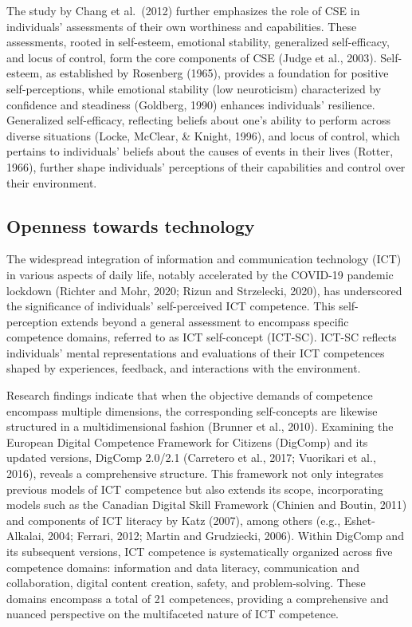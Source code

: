 \documentclass[
  12pt,
  a4paper,
  twoside]{article}
\begin{document}
The study by Chang et al.~(2012) further emphasizes the role of CSE in individuals' assessments of their own worthiness and capabilities. These assessments, rooted in self-esteem, emotional stability, generalized self-efficacy, and locus of control, form the core components of CSE (Judge et al., 2003). Self-esteem, as established by Rosenberg (1965), provides a foundation for positive self-perceptions, while emotional stability (low neuroticism) characterized by confidence and steadiness (Goldberg, 1990) enhances individuals' resilience. Generalized self-efficacy, reflecting beliefs about one's ability to perform across diverse situations (Locke, McClear, \& Knight, 1996), and locus of control, which pertains to individuals' beliefs about the causes of events in their lives (Rotter, 1966), further shape individuals' perceptions of their capabilities and control over their environment.

\hypertarget{openness-towards-technology}{%
\subsection{Openness towards technology}\label{openness-towards-technology}}

The widespread integration of information and communication technology (ICT) in various aspects of daily life, notably accelerated by the COVID-19 pandemic lockdown (Richter and Mohr, 2020; Rizun and Strzelecki, 2020), has underscored the significance of individuals' self-perceived ICT competence. This self-perception extends beyond a general assessment to encompass specific competence domains, referred to as ICT self-concept (ICT-SC). ICT-SC reflects individuals' mental representations and evaluations of their ICT competences shaped by experiences, feedback, and interactions with the environment.

Research findings indicate that when the objective demands of competence encompass multiple dimensions, the corresponding self-concepts are likewise structured in a multidimensional fashion (Brunner et al., 2010). Examining the European Digital Competence Framework for Citizens (DigComp) and its updated versions, DigComp 2.0/2.1 (Carretero et al., 2017; Vuorikari et al., 2016), reveals a comprehensive structure. This framework not only integrates previous models of ICT competence but also extends its scope, incorporating models such as the Canadian Digital Skill Framework (Chinien and Boutin, 2011) and components of ICT literacy by Katz (2007), among others (e.g., Eshet-Alkalai, 2004; Ferrari, 2012; Martin and Grudziecki, 2006).
Within DigComp and its subsequent versions, ICT competence is systematically organized across five competence domains: information and data literacy, communication and collaboration, digital content creation, safety, and problem-solving. These domains encompass a total of 21 competences, providing a comprehensive and nuanced perspective on the multifaceted nature of ICT competence.
\end{document}
